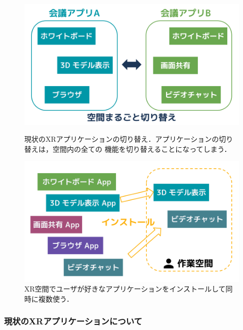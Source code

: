 \begin{figure}[htbp]
  \begin{minipage}[t]{0.50\linewidth}
    \centering
    \includegraphics[keepaspectratio, width=0.9\linewidth]{fig/xr-app-switch.png}
    \caption{
      現状のXRアプリケーションの切り替え．アプリケーションの切り替えは，空間内の全ての
      機能を切り替えることになってしまう．
    }
    \label{fig:xr-app-switch}
  \end{minipage}
  \begin{minipage}[t]{0.50\linewidth}
    \centering
    \includegraphics[keepaspectratio, width=\linewidth]{fig/xr-app-install.png}
    \caption{XR空間でユーザが好きなアプリケーションをインストールして同時に複数使う．}
    \label{fig:xr-app-install}
  \end{minipage}
\end{figure}

\subsubsection{現状のXRアプリケーションについて}

